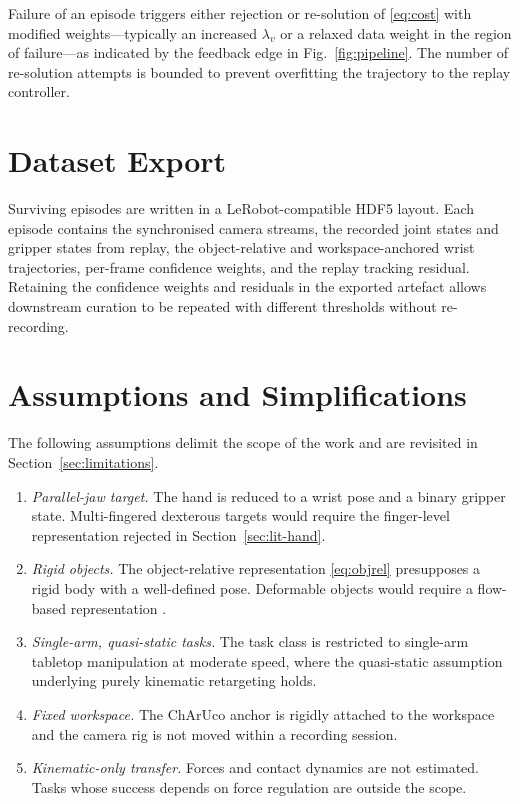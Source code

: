 Failure of an episode triggers either rejection or re-solution of
\eqref{eq:cost} with modified weights---typically an increased $\lambda_v$ or a
relaxed data weight in the region of failure---as indicated by the feedback
edge in Fig.~\ref{fig:pipeline}. The number of re-solution attempts is bounded
to prevent overfitting the trajectory to the replay controller.

\section{Dataset Export}
\label{sec:export}

Surviving episodes are written in a LeRobot-compatible HDF5 layout. Each
episode contains the synchronised camera streams, the recorded joint states and
gripper states from replay, the object-relative and workspace-anchored wrist
trajectories, per-frame confidence weights, and the replay tracking residual.
Retaining the confidence weights and residuals in the exported artefact allows
downstream curation to be repeated with different thresholds without
re-recording.

\section{Assumptions and Simplifications}
\label{sec:assumptions}

The following assumptions delimit the scope of the work and are revisited in
Section~\ref{sec:limitations}.

\begin{enumerate}[leftmargin=2em]
  \item \emph{Parallel-jaw target.} The hand is reduced to a wrist pose and a
        binary gripper state. Multi-fingered dexterous targets would require
        the finger-level representation rejected in
        Section~\ref{sec:lit-hand}.
  \item \emph{Rigid objects.} The object-relative representation
        \eqref{eq:objrel} presupposes a rigid body with a well-defined pose.
        Deformable objects would require a flow-based representation
        \cite{novaflow}.
  \item \emph{Single-arm, quasi-static tasks.} The task class is restricted to
        single-arm tabletop manipulation at moderate speed, where the
        quasi-static assumption underlying purely kinematic retargeting holds.
  \item \emph{Fixed workspace.} The ChArUco anchor is rigidly attached to the
        workspace and the camera rig is not moved within a recording session.
  \item \emph{Kinematic-only transfer.} Forces and contact dynamics are not
        estimated. Tasks whose success depends on force regulation are outside
        the scope.
\end{enumerate}
